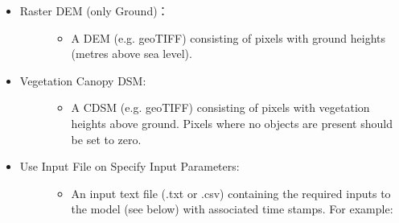 \documentclass[letterpaper,10pt,english]{sphinxmanual}
\begin{document}
\begin{itemize}
\begin{description}
\begin{itemize}
\end{itemize}

\end{description}

\item {} \begin{description}
\item[{Raster DEM (only Ground)：}] \leavevmode\begin{itemize}
\item {} 
A DEM (e.g. geoTIFF) consisting of pixels with ground heights (metres above sea level).

\end{itemize}

\end{description}

\item {} \begin{description}
\item[{Vegetation Canopy DSM:}] \leavevmode\begin{itemize}
\item {} 
A CDSM (e.g. geoTIFF) consisting of pixels with vegetation heights above ground. Pixels where no objects are present should be set to zero.

\end{itemize}

\end{description}

\item {} \begin{description}
\item[{Use Input File on Specify Input Parameters:}] \leavevmode\begin{itemize}
\item {} 
An input text file (.txt or .csv) containing the required inputs to the model (see below) with associated time stamps. For example:


\end{itemize}
\end{description}
\end{itemize}
\end{document}
